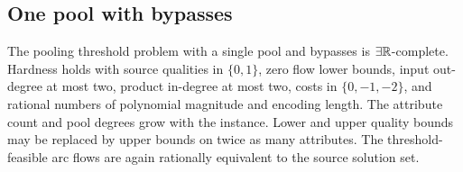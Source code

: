 \subsection{One pool with bypasses}\label{s2:one-pool}

\begin{theorem}\label{s2:one-pool-etr}
The pooling threshold problem with a single pool and bypasses is
$\exists\mathbb R$-complete. Hardness holds with source qualities in $\{0,1\}$,
zero flow lower bounds, input out-degree at most two, product in-degree
at most two, costs in $\{0,-1,-2\}$, and rational numbers of polynomial
magnitude and encoding length. The attribute count and pool degrees
grow with the instance. Lower and upper quality bounds may be replaced
by upper bounds on twice as many attributes. The threshold-feasible
arc flows are again rationally equivalent to the source solution set.
\end{theorem}
